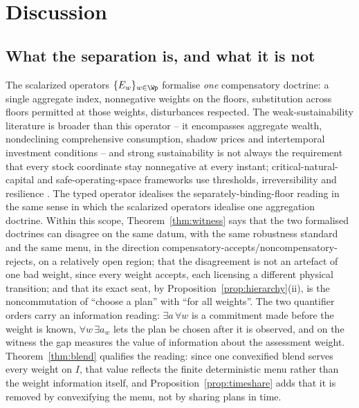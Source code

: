 \section{Discussion}\label{sec:discussion}

\subsection{What the separation is, and what it is not}\label{sec:scope}

The scalarized operators $\{E_w\}_{w\in\Wp}$ formalise \emph{one} compensatory doctrine: a single aggregate index, nonnegative weights on the floors, substitution across floors permitted at those weights, disturbances respected. The weak-sustainability literature is broader than this operator -- it encompasses aggregate wealth, nondeclining comprehensive consumption, shadow prices and intertemporal investment conditions \citep{Solow1974,Asheim1994,DasguptaMaler2000,Neumayer2013} -- and strong sustainability is not always the requirement that every stock coordinate stay nonnegative at every instant; critical-natural-capital and safe-operating-space frameworks use thresholds, irreversibility and resilience \citep{Ekins2003,Rockstrom2009,Raworth2012,DoyenGajardo2020}. The typed operator idealises the separately-binding-floor reading in the same sense in which the scalarized operators idealise one aggregation doctrine. Within this scope, Theorem~\ref{thm:witness} says that the two formalised doctrines can disagree on the same datum, with the same robustness standard and the same menu, in the direction compensatory-accepts/noncompensatory-rejects, on a relatively open region; that the disagreement is not an artefact of one bad weight, since every weight accepts, each licensing a different physical transition; and that its exact seat, by Proposition~\ref{prop:hierarchy}(ii), is the noncommutation of ``choose a plan'' with ``for all weights''. The two quantifier orders carry an information reading: $\exists a\,\forall w$ is a commitment made before the weight is known, $\forall w\,\exists a_w$ lets the plan be chosen after it is observed, and on the witness the gap measures the value of information about the assessment weight. Theorem~\ref{thm:blend} qualifies the reading: since one convexified blend serves every weight on $I$, that value reflects the finite deterministic menu rather than the weight information itself, and Proposition~\ref{prop:timeshare} adds that it is removed by convexifying the menu, not by sharing plans in time.

